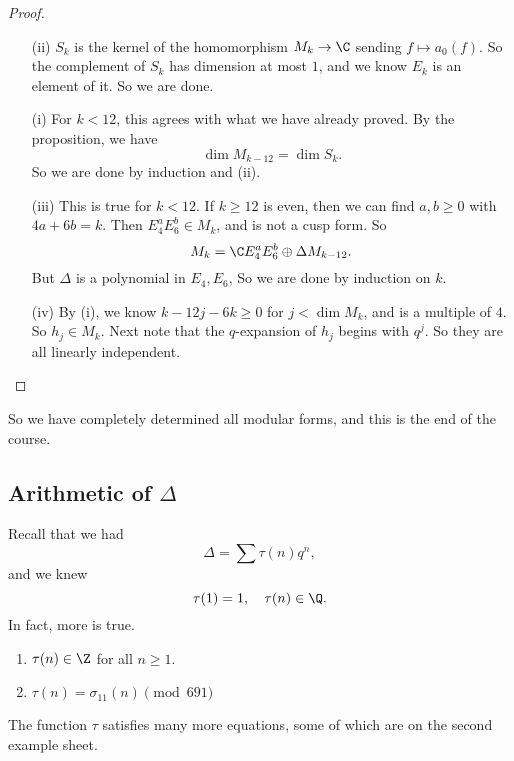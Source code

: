 \documentclass[a4paper]{article}
\begin{document}
\begin{proof}\leavevmode
  \begin{enumerate}
    \item[(ii)] $S_k$ is the kernel of the homomorphism $M_k \to \C$ sending $f \mapsto a_0(f)$. So the complement of $S_k$ has dimension at most $1$, and we know $E_k$ is an element of it. So we are done.
    \item[(i)] For $k < 12$, this agrees with what we have already proved. By the proposition, we have
      \[
        \dim M_{k - 12} = \dim S_k.
      \]
      So we are done by induction and (ii).
    \item[(iii)] This is true for $k < 12$. If $k \geq 12$ is even, then we can find $a, b \geq 0$ with $4a + 6b = k$. Then $E_4^a E_6^b \in M_k$, and is not a cusp form. So
      \[
        M_k = \C E_4^a E_6^b \oplus \Delta M_{k - 12}.
      \]
      But $\Delta$ is a polynomial in $E_4, E_6$, So we are done by induction on $k$.
    \item[(iv)] By (i), we know $k - 12j - 6k \geq 0$ for $j < \dim M_k$, and is a multiple of $4$. So $h_j \in M_k$. Next note that the $q$-expansion of $h_j$ begins with $q^j$. So they are all linearly independent.\qedhere
  \end{enumerate}
\end{proof}
So we have completely determined all modular forms, and this is the end of the course.

\newpage
\subsection{Arithmetic of \texorpdfstring{$\Delta$}{Delta}}
Recall that we had
\[
  \Delta = \sum \tau(n) q^n,
\]
and we knew
\[
  \tau(1) = 1,\quad \tau(n) \in \Q.
\]
In fact, more is true.
\begin{prop}\leavevmode
  \begin{enumerate}
    \item $\tau(n) \in \Z$ for all $n \geq 1$.
    \item $\tau(n) = \sigma_{11}(n) \pmod {691}$
  \end{enumerate}
\end{prop}
The function $\tau$ satisfies many more equations, some of which are on the second example sheet.
\end{document}
